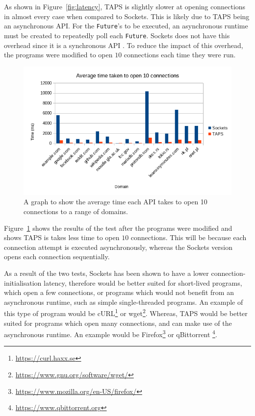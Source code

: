 As shown in Figure~\ref{fig:latency}, TAPS is slightly slower at opening connections in almost every case when compared
to Sockets.
This is likely due to TAPS being an asynchronous API.
For the \texttt{Future}'s to be executed, an asynchronous runtime must be created to repeatedly poll each
\texttt{Future}.
Sockets does not have this overhead since it is a synchronous API .
To reduce the impact of this overhead, the programs were modified to open \(10\) connections each time they were run.

\begin{figure}[h!]
    \includegraphics[width=\textwidth]{../data/processed/avg_multi}
    \caption{A graph to show the average time each API takes to open 10 connections to a range of domains.}
    \label{fig:multiLatency}
\end{figure}

Figure~\ref{fig:multiLatency} shows the results of the test after the programs were modified and shows TAPS is takes
less time to open \(10\) connections.
This will be because each connection attempt is executed asynchronously, whereas the Sockets version opens each
connection sequentially.

As a result of the two tests, Sockets has been shown to have a lower connection-initialisation latency, therefore would
be better suited for short-lived programs, which open a few connections, or programs which would not benefit from an
asynchronous runtime, such as simple single-threaded programs.
An example of this type of program would be cURL\footnote{\url{https://curl.haxx.se}} or
wget\footnote{\url{https://www.gnu.org/software/wget/}}.
Whereas, TAPS would be better suited for programs which open many connections, and can make use of the asynchronous
runtime.
An example would be Firefox\footnote{\url{https://www.mozilla.org/en-US/firefox/}} or qBittorrent
\footnote{\url{https://www.qbittorrent.org}}.

